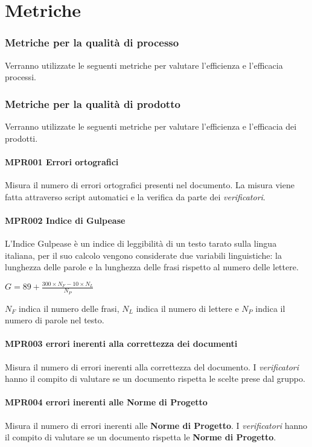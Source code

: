 \chapter{Metriche}
\label{metriche}
\subsection{Metriche per la qualità di processo}
Verranno utilizzate le seguenti metriche per valutare l'efficienza e l'efficacia 
processi.
\subsection{Metriche per la qualità di prodotto}
Verranno utilizzate le seguenti metriche per valutare l'efficienza e l'efficacia dei
prodotti.
\subsubsection{MPR001 Errori ortografici}
Misura il numero di errori ortografici presenti nel documento. La misura viene fatta attraverso script automatici e la verifica da parte dei \textit{verificatori}.

\subsubsection{MPR002 Indice di Gulpease}
L’Indice Gulpease è un indice di leggibilità di un testo tarato sulla lingua italiana, per il suo calcolo vengono considerate due variabili linguistiche: la lunghezza delle parole e la lunghezza delle frasi rispetto al numero delle lettere.
\begin{center}{$G=89+\frac{300\times N_F-10\times N_L}{N_P}$}\end{center}
$N_F$ indica il numero delle frasi, $N_L$ indica il numero di lettere e $N_P$ indica il numero di parole nel testo.

\subsubsection{MPR003 errori inerenti alla correttezza dei documenti}
Misura il numero di errori inerenti alla correttezza del documento. I \textit{verificatori} hanno il compito di valutare se un documento rispetta le scelte prese dal gruppo.

\subsubsection{MPR004 errori inerenti alle Norme di Progetto}
Misura il numero di errori inerenti alle \textbf{Norme di Progetto}. I \textit{verificatori} hanno il compito di valutare se un documento rispetta le \textbf{Norme di Progetto}.


